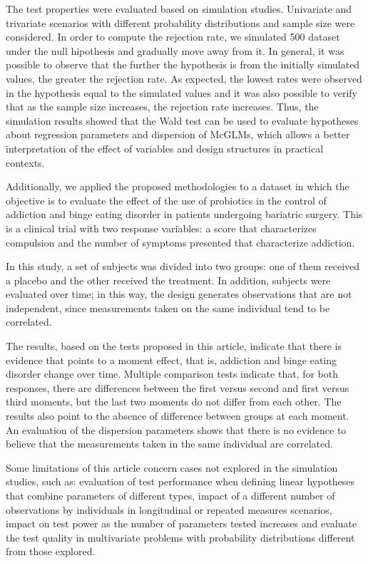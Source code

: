 \documentclass[AMA,STIX1COL]{WileyNJD-v2}
\begin{document}
The test properties were evaluated based on simulation studies. Univariate and trivariate scenarios with different probability distributions and sample size were considered.
In order to compute the rejection rate, we simulated 500 dataset under the null hipothesis and gradually move away from it. 
In general, it was possible to observe that the further the hypothesis is from the initially simulated values, the greater the rejection rate. 
As expected, the lowest rates were observed in the hypothesis equal to the simulated values and it was also possible to verify that as the sample size increases, 
the rejection rate increases. Thus, the simulation results showed that the Wald test can be used to evaluate hypotheses about regression parameters and dispersion of McGLMs, 
which allows a better interpretation of the effect of variables and design structures in practical contexts.

Additionally, we applied the proposed methodologies to a dataset in which the objective is to evaluate the effect of the use of probiotics in the control of addiction and binge eating 
disorder in patients undergoing bariatric surgery. This is a clinical trial with two response variables: a score that characterizes compulsion and the number of symptoms presented that characterize addiction.

In this study, a set of subjects was divided into two groups: one of them received a placebo and the other received the treatment. 
In addition, subjects were evaluated over time; in this way, the design generates observations that are not independent, since measurements taken on the same individual tend to be correlated.

The results, based on the tests proposed in this article, indicate that there is evidence that points to a moment effect, that is, addiction and binge eating disorder change over time. 
Multiple comparison tests indicate that, for both responses, there are differences between the first versus second and first versus third moments, but the last two moments do not differ from each other. 
The results also point to the absence of difference between groups at each moment. An evaluation of the dispersion parameters shows that there is no evidence to believe that the measurements taken in the same individual are correlated.

Some limitations of this article concern cases not explored in the simulation studies, such as: evaluation of test performance when defining linear hypotheses that combine parameters of different types, impact of a different number of observations by individuals in longitudinal or repeated measures scenarios, impact on test power as the number of parameters tested increases and evaluate the test quality in multivariate problems with probability distributions different from those explored.
\end{document}
